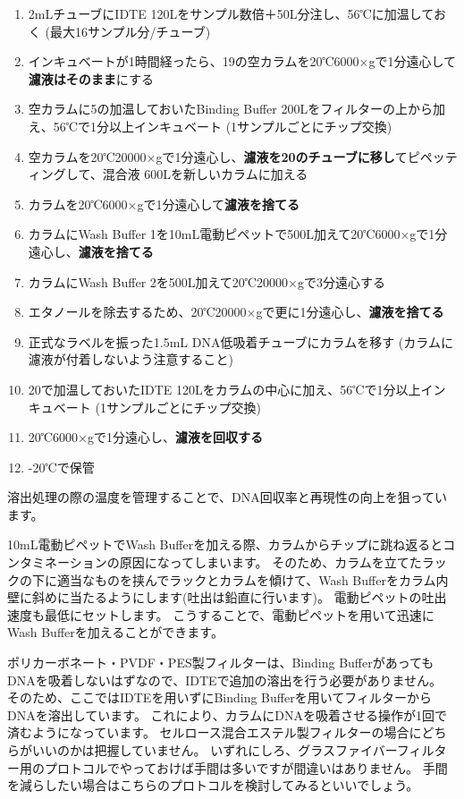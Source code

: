 \documentclass[titlepage,10pt,a4paper,uplatex]{jsbook}
\renewcommand{\textbf}[1]{{\bfseries\sffamily#1}}
\begin{document}
\begin{enumerate}
\item 2mLチューブにIDTE 120{\textmu}Lをサンプル数倍＋50{\textmu}L分注し、56℃に加温しておく (最大16サンプル分/チューブ)
\item インキュベートが1時間経ったら、19の空カラムを20℃6000×gで1分遠心して\textbf{濾液はそのまま}にする
\item 空カラムに5の加温しておいたBinding Buffer 200{\textmu}Lをフィルターの上から加え、56℃で1分以上インキュベート (1サンプルごとにチップ交換)
\item 空カラムを20℃20000×gで1分遠心し、\textbf{濾液を20のチューブに移し}てピペッティングして、混合液 600{\textmu}Lを新しいカラムに加える
\item カラムを20℃6000×gで1分遠心して\textbf{濾液を捨てる}
\item カラムにWash Buffer 1を10mL電動ピペットで500{\textmu}L加えて20℃6000×gで1分遠心し、\textbf{濾液を捨てる}
\item カラムにWash Buffer 2を500{\textmu}L加えて20℃20000×gで3分遠心する
\item エタノールを除去するため、20℃20000×gで更に1分遠心し、\textbf{濾液を捨てる}
\item 正式なラベルを振った1.5mL DNA低吸着チューブにカラムを移す (カラムに濾液が付着しないよう注意すること)
\item 20で加温しておいたIDTE 120{\textmu}Lをカラムの中心に加え、56℃で1分以上インキュベート (1サンプルごとにチップ交換)
\item 20℃6000×gで1分遠心し、\textbf{濾液を回収する}
\item -20℃で保管
\end{enumerate}

溶出処理の際の温度を管理することで、DNA回収率と再現性の向上を狙っています。

10mL電動ピペットでWash Bufferを加える際、カラムからチップに跳ね返るとコンタミネーションの原因になってしまいます。
そのため、カラムを立てたラックの下に適当なものを挟んでラックとカラムを傾けて、Wash Bufferをカラム内壁に斜めに当たるようにします(吐出は鉛直に行います)。
電動ピペットの吐出速度も最低にセットします。
こうすることで、電動ピペットを用いて迅速にWash Bufferを加えることができます。

ポリカーボネート・PVDF・PES製フィルターは、Binding BufferがあってもDNAを吸着しないはずなので、IDTEで追加の溶出を行う必要がありません。
そのため、ここではIDTEを用いずにBinding Bufferを用いてフィルターからDNAを溶出しています。
これにより、カラムにDNAを吸着させる操作が1回で済むようになっています。
セルロース混合エステル製フィルターの場合にどちらがいいのかは把握していません。
いずれにしろ、グラスファイバーフィルター用のプロトコルでやっておけば手間は多いですが間違いはありません。
手間を減らしたい場合はこちらのプロトコルを検討してみるといいでしょう。
\end{document}

